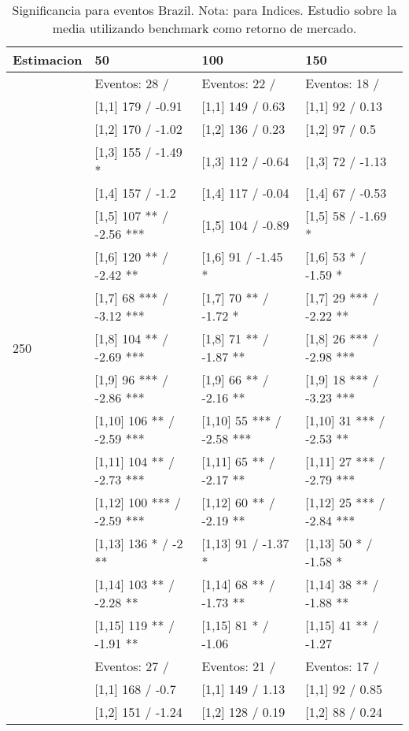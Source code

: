 \begin{table}

\caption{Significancia para eventos Brazil. Nota: para Indices. Estudio sobre la media utilizando benchmark como retorno de mercado.}
\centering
\begin{tabular}[t]{llll}
\toprule
Estimacion & 50 & 100 & 150\\
\midrule
 & Eventos:  28 / & Eventos:  22 / & Eventos:  18 /\\
 & {}[1,1] 179  / -0.91 & {}[1,1] 149  / 0.63 & {}[1,1] 92  / 0.13\\
 & {}[1,2] 170  / -1.02 & {}[1,2] 136  / 0.23 & {}[1,2] 97  / 0.5\\
 & {}[1,3] 155  / -1.49 * & {}[1,3] 112  / -0.64 & {}[1,3] 72  / -1.13\\
 & {}[1,4] 157  / -1.2 & {}[1,4] 117  / -0.04 & {}[1,4] 67  / -0.53\\
\addlinespace
 & {}[1,5] 107 ** / -2.56 *** & {}[1,5] 104  / -0.89 & {}[1,5] 58  / -1.69 *\\
 & {}[1,6] 120 ** / -2.42 ** & {}[1,6] 91  / -1.45 * & {}[1,6] 53 * / -1.59 *\\
 & {}[1,7] 68 *** / -3.12 *** & {}[1,7] 70 ** / -1.72 * & {}[1,7] 29 *** / -2.22 **\\
250 & {}[1,8] 104 ** / -2.69 *** & {}[1,8] 71 ** / -1.87 ** & {}[1,8] 26 *** / -2.98 ***\\
 & {}[1,9] 96 *** / -2.86 *** & {}[1,9] 66 ** / -2.16 ** & {}[1,9] 18 *** / -3.23 ***\\
\addlinespace
 & {}[1,10] 106 ** / -2.59 *** & {}[1,10] 55 *** / -2.58 *** & {}[1,10] 31 *** / -2.53 **\\
 & {}[1,11] 104 ** / -2.73 *** & {}[1,11] 65 ** / -2.17 ** & {}[1,11] 27 *** / -2.79 ***\\
 & {}[1,12] 100 *** / -2.59 *** & {}[1,12] 60 ** / -2.19 ** & {}[1,12] 25 *** / -2.84 ***\\
 & {}[1,13] 136 * / -2 ** & {}[1,13] 91  / -1.37 * & {}[1,13] 50 * / -1.58 *\\
 & {}[1,14] 103 ** / -2.28 ** & {}[1,14] 68 ** / -1.73 ** & {}[1,14] 38 ** / -1.88 **\\
\addlinespace
 & {}[1,15] 119 ** / -1.91 ** & {}[1,15] 81 * / -1.06 & {}[1,15] 41 ** / -1.27\\
 & Eventos:  27 / & Eventos:  21 / & Eventos:  17 /\\
 & {}[1,1] 168  / -0.7 & {}[1,1] 149  / 1.13 & {}[1,1] 92  / 0.85\\
 & {}[1,2] 151  / -1.24 & {}[1,2] 128  / 0.19 & {}[1,2] 88  / 0.24\\

\end{tabular}
\end{table}
